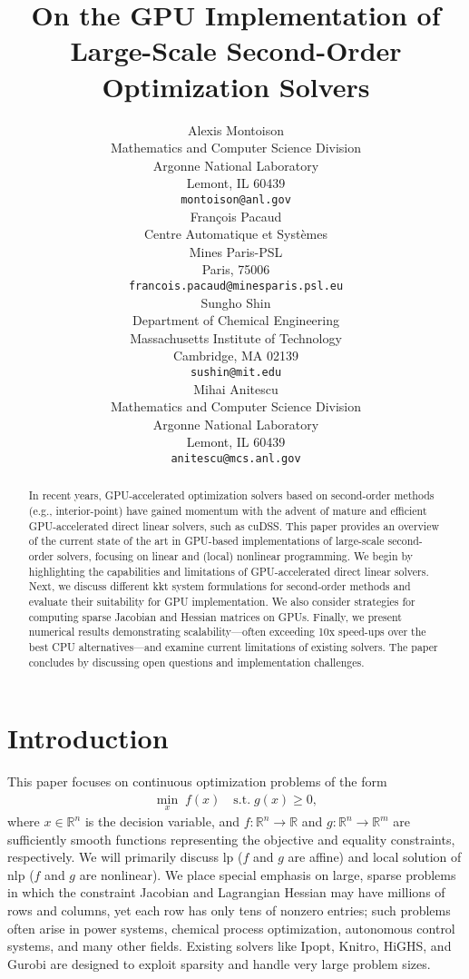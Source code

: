 \documentclass{article}
\title{On the GPU Implementation of Large-Scale Second-Order Optimization Solvers}
\author{%
  Alexis Montoison\\
  Mathematics and Computer Science Division\\
  Argonne National Laboratory\\
  Lemont, IL 60439\\
  \texttt{montoison@anl.gov}\\
  \And
  Fran\c{c}ois Pacaud\\
  Centre Automatique et Systèmes\\
  Mines Paris-PSL\\
  Paris, 75006 \\
  \texttt{francois.pacaud@minesparis.psl.eu}\\
  \And
  Sungho Shin\\
  Department of Chemical Engineering\\
  Massachusetts Institute of Technology\\
  Cambridge, MA 02139\\
  \texttt{sushin@mit.edu}\\
  \And
  Mihai Anitescu\\
  Mathematics and Computer Science Division\\
  Argonne National Laboratory\\
  Lemont, IL 60439\\
  \texttt{anitescu@mcs.anl.gov}\\
}
\begin{document}
\maketitle


\begin{abstract}
In recent years, GPU-accelerated optimization solvers based on second-order methods (e.g., interior-point) have gained momentum with the advent of mature and efficient GPU-accelerated direct linear solvers, such as cuDSS. This paper provides an overview of the current state of the art in GPU-based implementations of large-scale second-order solvers, focusing on linear and (local) nonlinear programming. We begin by highlighting the capabilities and limitations of GPU-accelerated direct linear solvers. Next, we discuss different \gls*{kkt} system formulations for second-order methods and evaluate their suitability for GPU implementation. We also consider strategies for computing sparse Jacobian and Hessian matrices on GPUs. Finally, we present numerical results demonstrating scalability—often exceeding 10x speed-ups over the best CPU alternatives—and examine current limitations of existing solvers. The paper concludes by discussing open questions and implementation challenges.
\end{abstract}


\section{Introduction}\label{eqn:intro}

This paper focuses on continuous optimization problems of the form
\begin{align}
  \min_{x } \; f(x) \quad \text{s.t.} \; g(x) \geq 0,
\end{align}
where \(x \in \mathbb{R}^n\) is the decision variable, and \(f: \mathbb{R}^n \to \mathbb{R}\) and \(g: \mathbb{R}^n \to \mathbb{R}^m\) are sufficiently smooth functions representing the objective and equality constraints, respectively.
We will primarily discuss \gls*{lp} ($f$ and $g$ are affine) and local solution of \gls*{nlp} ($f$ and $g$ are nonlinear).
We place special emphasis on large, sparse problems in which the constraint Jacobian and Lagrangian Hessian may have millions of rows and columns, yet each row has only tens of nonzero entries; such problems often arise in power systems, chemical process optimization, autonomous control systems, and many other fields.
Existing solvers like Ipopt, Knitro, HiGHS, and Gurobi are designed to exploit sparsity and handle very large problem sizes.
\end{document}
